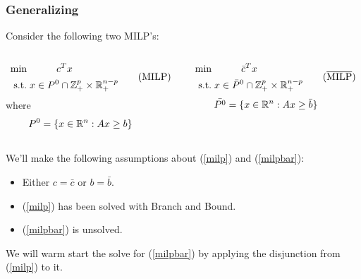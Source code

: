 \documentclass{beamer}
\begin{document}
	\begin{frame}[t]
		\frametitle{Generalizing}
		\small
		Consider the following two MILP's:
		\begin{columns}[T]
			\begin{column}{0.5\textwidth}
				\vspace{-.25cm}
				\begin{align}
					\begin{split}
						\text{min}& \qquad \quad c^T x \\
						\text{s.t.}& \; x \in P^0 \cap \mathbb{Z}^p_+  \times \mathbb{R}^{n-p}_+ \\
					\end{split}
					\label{milp}
					\tag{MILP}
				\end{align}
				\; where
				\begin{align*}
					P^0 = \{x \in \mathbb{R}^n : Ax \geq b\} \qquad
				\end{align*}
			\end{column}
			\begin{column}{0.5\textwidth}
				\vspace{-.25cm}
				\begin{align}
					\begin{split}
						\text{min}& \qquad \quad \bar{c}^T x \\
						\text{s.t.}& \; x \in \bar{P}^0 \cap \Zmbb^p_+  \times \Rmbb^{n-p}_+ \\
					\end{split}
					\label{milpbar}
					\tag{$ \overline{\text{MILP}} $}
				\end{align}
				\vspace{.25cm}
				\begin{align*}
					\bar{P^0} = \{x \in \mathbb{R}^n : Ax \geq \bar{b}\} \qquad
				\end{align*}
			\end{column}
		\end{columns}
		\vspace{.25cm}
		We'll make the following assumptions about (\ref{milp}) and (\ref{milpbar}):
		\begin{itemize}
			\item Either $ c = \bar{c} $ or $ b = \bar{b} $.
			\item (\ref{milp}) has been solved with Branch and Bound.
			\item (\ref{milpbar}) is unsolved.
		\end{itemize}
		\begin{block}{}
			We will warm start the solve for (\ref{milpbar}) by applying the disjunction from (\ref{milp}) to it.
		\end{block}
		\normalsize
	\end{frame}
\end{document}
